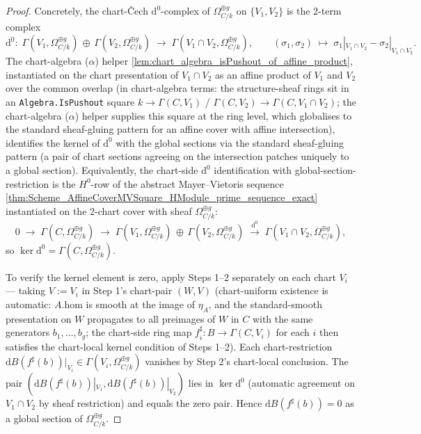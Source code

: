 \begin{proof}
  Concretely, the chart-\v Cech \(\mathrm d^{0}\)-complex of \(\Omega_{C/k}^{\oplus g}\) on \(\{V_1, V_2\}\) is the 2-term complex
  \[
    \mathrm d^{0} \colon\; \Gamma(V_1, \Omega_{C/k}^{\oplus g}) \,\oplus\, \Gamma(V_2, \Omega_{C/k}^{\oplus g}) \;\longrightarrow\; \Gamma(V_1 \cap V_2, \Omega_{C/k}^{\oplus g}), \qquad (\sigma_1, \sigma_2) \;\mapsto\; \sigma_1|_{V_1 \cap V_2} - \sigma_2|_{V_1 \cap V_2}.
  \]
  The chart-algebra (\(\alpha\)) helper \cref{lem:chart_algebra_isPushout_of_affine_product}, instantiated on the chart presentation of \(V_1 \cap V_2\) as an affine product of \(V_1\) and \(V_2\) over the common overlap (in chart-algebra terms: the structure-sheaf rings sit in an \texttt{Algebra.IsPushout} square \(k \to \Gamma(C, V_1)\) / \(\Gamma(C, V_2) \to \Gamma(C, V_1 \cap V_2)\); the chart-algebra (\(\alpha\)) helper supplies this square at the ring level, which globalises to the standard sheaf-gluing pattern for an affine cover with affine intersection), identifies the kernel of \(\mathrm d^{0}\) with the global sections via the standard sheaf-gluing pattern (a pair of chart sections agreeing on the intersection patches uniquely to a global section). Equivalently, the chart-side \(\mathrm d^{0}\) identification with global-section-restriction is the \(H^{0}\)-row of the abstract Mayer--Vietoris sequence \cref{thm:Scheme_AffineCoverMVSquare_HModule_prime_sequence_exact} instantiated on the 2-chart cover with sheaf \(\Omega_{C/k}^{\oplus g}\):
  \[
    0 \;\to\; \Gamma(C, \Omega_{C/k}^{\oplus g}) \;\to\; \Gamma(V_1, \Omega_{C/k}^{\oplus g}) \,\oplus\, \Gamma(V_2, \Omega_{C/k}^{\oplus g}) \;\xrightarrow{\mathrm d^{0}}\; \Gamma(V_1 \cap V_2, \Omega_{C/k}^{\oplus g}),
  \]
  so \(\ker \mathrm d^{0} = \Gamma(C, \Omega_{C/k}^{\oplus g})\).

  To verify the kernel element is zero, apply Steps 1--2 separately on each chart \(V_i\) — taking \(V := V_i\) in Step 1's chart-pair \((W, V)\) (chart-uniform existence is automatic: \(A.\mathrm{hom}\) is smooth at the image of \(\eta_A\), and the standard-smooth presentation on \(W\) propagates to all preimages of \(W\) in \(C\) with the same generators \(b_1, \ldots, b_g\); the chart-side ring map \(f^{\sharp}_i \colon B \to \Gamma(C, V_i)\) for each \(i\) then satisfies the chart-local kernel condition of Steps 1--2). Each chart-restriction \(\mathrm dB(f^{\sharp}(b))|_{V_i} \in \Gamma(V_i, \Omega_{C/k}^{\oplus g})\) vanishes by Step 2's chart-local conclusion. The pair \((\mathrm dB(f^{\sharp}(b))|_{V_1}, \mathrm dB(f^{\sharp}(b))|_{V_2})\) lies in \(\ker \mathrm d^{0}\) (automatic agreement on \(V_1 \cap V_2\) by sheaf restriction) and equals the zero pair. Hence \(\mathrm dB(f^{\sharp}(b)) = 0\) as a global section of \(\Omega_{C/k}^{\oplus g}\).


\end{proof}
